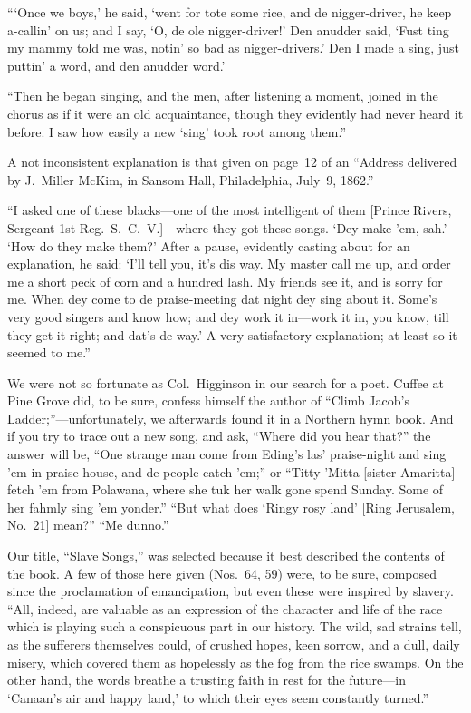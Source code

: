 \documentclass[a5paper,10pt]{book}
\begin{document}
``{}`Once we boys,' he said, `went for tote some rice, and de
nigger-driver, he keep a-callin' on us; and I say, `O, de ole
nigger-driver!'  Den anudder said, `Fust ting my mammy told me was,
notin' so bad as nigger-drivers.'  Den I made a sing, just puttin' a
word, and den anudder word.'

``Then he began singing, and the men, after listening a moment, joined
in the chorus as if it were an old acquaintance, though they evidently
had never heard it before.  I saw how easily a new `sing' took root
among them.''

A not inconsistent explanation is that given on page~12 of an
``Address delivered by J.~Miller McKim, in Sansom Hall, Philadelphia,
July~9, 1862.''

``I asked one of these blacks---one of the most intelligent of them
[Prince Rivers, Sergeant 1st Reg.~S.~C.~V.]---where they got these
songs.  `Dey make 'em, sah.'  `How do they make them?'  After a pause,
evidently casting about for an explanation, he said: `I'll tell you,
it's dis way.  My master call me up, and order me a short peck of corn
and a hundred lash.  My friends see it, and is sorry for me.  When dey
come to de praise-meeting dat night dey sing about it.  Some's very
good singers and know how; and dey work it in---work it in, you know,
till they get it right; and dat's de way.'  A very satisfactory
explanation; at least so it seemed to me.''

We were not so fortunate as Col.~Higginson in our search for a poet.
Cuffee at Pine Grove did, to be sure, confess himself the author of
``Climb Jacob's Ladder;''---unfortunately, we afterwards found it in a
Northern hymn book.  And if you try to trace out a new song, and ask,
``Where did you hear that?'' the answer will be, ``One strange man
come from Eding's las' praise-night and sing 'em in praise-house, and
de people catch 'em;'' or ``Titty 'Mitta [sister Amaritta] fetch 'em
from Polawana, where she tuk her walk gone spend Sunday.  Some of her
fahmly sing 'em yonder.''  ``But what does `Ringy rosy land' [Ring
Jerusalem, No.~21] mean?'' ``Me dunno.''

Our title, ``Slave Songs,'' was selected because it best described the
contents of the book.  A few of those here given (Nos.~64, 59) were,
to be sure, composed since the proclamation of emancipation, but even
these were inspired by slavery.  ``All, indeed, are valuable as an
expression of the character and life of the race which is playing such
a conspicuous part in our history.  The wild, sad strains tell, as the
sufferers themselves could, of crushed hopes, keen sorrow, and a dull,
daily misery, which covered them as hopelessly as the fog from the
rice swamps.  On the other hand, the words breathe a trusting faith in
rest for the future---in `Canaan's air and happy land,' to which their
eyes seem constantly turned.''
\end{document}
